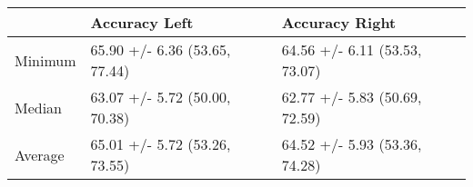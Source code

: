 \begin{tabular}{lll}
\toprule
{} &                  Accuracy Left &                 Accuracy Right \\
\midrule
Minimum &  65.90 +/- 6.36 (53.65, 77.44) &  64.56 +/- 6.11 (53.53, 73.07) \\
Median  &  63.07 +/- 5.72 (50.00, 70.38) &  62.77 +/- 5.83 (50.69, 72.59) \\
Average &  65.01 +/- 5.72 (53.26, 73.55) &  64.52 +/- 5.93 (53.36, 74.28) \\
\bottomrule
\end{tabular}
